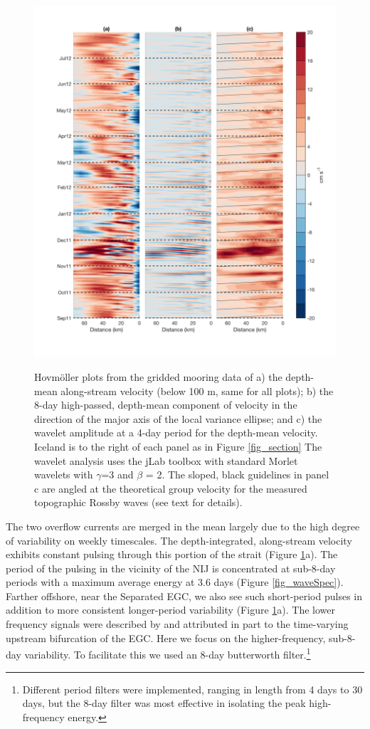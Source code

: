 \documentclass[12pt,titlepage,figuresatend]{article}
\begin{document}
\begin{figure}[p!]
  \centering\includegraphics[width=\hsize]{./figures/hoff_vars.pdf}
  \caption{Hovm\"{o}ller plots from the gridded mooring data of a) the depth-mean along-stream velocity (below 100 m, same for all plots); b) the 8-day high-passed, depth-mean component of velocity in the direction of the major axis of the local variance ellipse; and c) the wavelet amplitude at a 4-day period for the depth-mean velocity. Iceland is to the right of each panel as in Figure \ref{fig_section} The wavelet analysis uses the jLab toolbox \cite[]{Lilly2017} with standard Morlet wavelets with $\gamma$=3 and $\beta$ = 2. The sloped, black guidelines in panel c are angled at the theoretical group velocity for the measured topographic Rossby waves (see text for details).}{\label{fig_hoff}}
\end{figure}


The two overflow currents are merged in the mean largely due to the high degree of variability on weekly timescales. The depth-integrated, along-stream velocity exhibits constant pulsing through this portion of the strait (Figure \ref{fig_hoff}a). The period of the pulsing in the vicinity of the NIJ is concentrated at sub-8-day periods with a maximum average energy at 3.6 days (Figure \ref{fig_waveSpec}). Farther offshore, near the Separated EGC, we also see such short-period pulses in addition to more consistent longer-period variability (Figure \ref{fig_hoff}a). The lower frequency signals were described by \cite{Harden2016} and attributed in part to the time-varying upstream bifurcation of the EGC. Here we focus on the higher-frequency, sub-8-day variability. To facilitate this we used an 8-day butterworth filter.\footnote{Different period filters were implemented, ranging in length from 4 days to 30 days, but the 8-day filter was most effective in isolating the peak high-frequency energy.}
\end{document}
